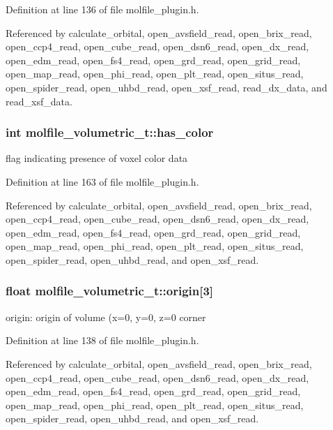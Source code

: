 Definition at line 136 of file molfile\_\-plugin.h.

Referenced by calculate\_\-orbital, open\_\-avsfield\_\-read, open\_\-brix\_\-read, open\_\-ccp4\_\-read, open\_\-cube\_\-read, open\_\-dsn6\_\-read, open\_\-dx\_\-read, open\_\-edm\_\-read, open\_\-fs4\_\-read, open\_\-grd\_\-read, open\_\-grid\_\-read, open\_\-map\_\-read, open\_\-phi\_\-read, open\_\-plt\_\-read, open\_\-situs\_\-read, open\_\-spider\_\-read, open\_\-uhbd\_\-read, open\_\-xsf\_\-read, read\_\-dx\_\-data, and read\_\-xsf\_\-data.
\subsubsection{\setlength{\rightskip}{0pt plus 5cm}int molfile\_\-volumetric\_\-t::has\_\-color}\label{structmolfile__volumetric__t_m8}


flag indicating presence of voxel color data 

Definition at line 163 of file molfile\_\-plugin.h.

Referenced by calculate\_\-orbital, open\_\-avsfield\_\-read, open\_\-brix\_\-read, open\_\-ccp4\_\-read, open\_\-cube\_\-read, open\_\-dsn6\_\-read, open\_\-dx\_\-read, open\_\-edm\_\-read, open\_\-fs4\_\-read, open\_\-grd\_\-read, open\_\-grid\_\-read, open\_\-map\_\-read, open\_\-phi\_\-read, open\_\-plt\_\-read, open\_\-situs\_\-read, open\_\-spider\_\-read, open\_\-uhbd\_\-read, and open\_\-xsf\_\-read.
\subsubsection{\setlength{\rightskip}{0pt plus 5cm}float molfile\_\-volumetric\_\-t::origin[3]}\label{structmolfile__volumetric__t_m1}


origin: origin of volume (x=0, y=0, z=0 corner 

Definition at line 138 of file molfile\_\-plugin.h.

Referenced by calculate\_\-orbital, open\_\-avsfield\_\-read, open\_\-brix\_\-read, open\_\-ccp4\_\-read, open\_\-cube\_\-read, open\_\-dsn6\_\-read, open\_\-dx\_\-read, open\_\-edm\_\-read, open\_\-fs4\_\-read, open\_\-grd\_\-read, open\_\-grid\_\-read, open\_\-map\_\-read, open\_\-phi\_\-read, open\_\-plt\_\-read, open\_\-situs\_\-read, open\_\-spider\_\-read, open\_\-uhbd\_\-read, and open\_\-xsf\_\-read.
